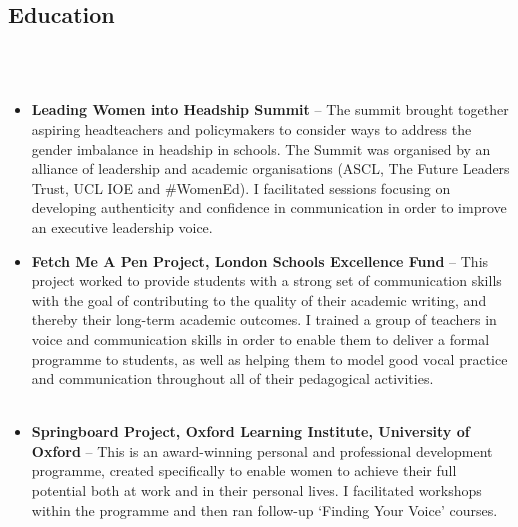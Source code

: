 \documentclass[11pt,a4paper,arial]{moderncv}        %
\begin{document}
\medskip
\subsection{Education}
\\~\\
\begin{itemize}
\small
\item \textbf{Leading Women into Headship Summit} -- The summit brought together aspiring headteachers and policymakers to consider ways to address the gender imbalance in headship in schools. The Summit was organised by an alliance of leadership and academic organisations (ASCL, The Future Leaders Trust, UCL IOE and #WomenEd). I facilitated sessions focusing on developing authenticity and confidence in communication in order to improve an executive leadership voice. \\
\item \textbf{Fetch Me A Pen Project, London Schools Excellence Fund} -- This project worked to provide students with a strong set of communication skills with the goal of contributing to the quality of their academic writing, and thereby their long-term academic outcomes. I trained a group of teachers in voice and communication skills in order to enable them to deliver a formal programme to students, as well as helping them to model good vocal practice and communication throughout all of their pedagogical activities.\\\\
\item \textbf{Springboard Project, Oxford Learning Institute, University of Oxford} -- This is an award-winning personal and professional development programme, created specifically to enable women to achieve their full potential both at work and in their personal lives. I facilitated workshops within the programme and then ran follow-up `Finding Your Voice' courses.
\end{itemize}
\end{document}

